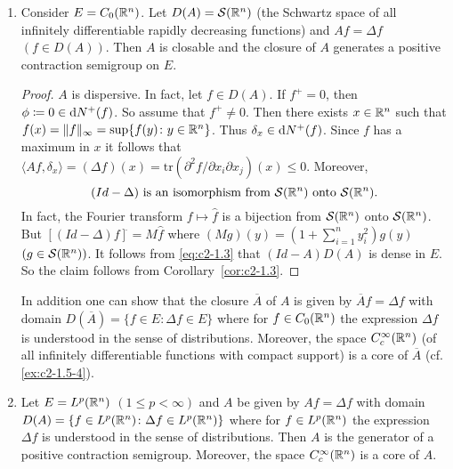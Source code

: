 \begin{examples}
\begin{enumerate}[\upshape (i), wide, labelsep=.5em]
\begin{proof}
We have shown that $A$ is dispersive. 
As in \ref{ex:c2-1.5-1}   one shows that $(Id - A)$ is surjective. 
Now the claim follows from Theorem \ref{thm:c2-1.2}  .
\end{proof}
\item \label{ex:c2-1.5-3} 
Consider $E = C_{0}(\mathbb{R}^{n})$. 
Let $D(A) = \mathcal{S}(\mathbb{R}^{n})$ (the Schwartz space of all infinitely differentiable rapidly decreasing functions) and $Af = \Delta f$ $(f \in D(A))$. 
Then $A$ is closable and the closure of $A$ generates a positive contraction semigroup on $E$.
\begin{proof}
$A$ is dispersive. 
In fact, let $f \in D(A)$. 
If $f^{+} = 0$, then $\phi \coloneqq 0 \in \mathop{}\!\mathrm{d}{N^{+}}(f)$. 
So assume that $f^{+} \neq 0$. 
Then there exists $x \in \mathbb{R}^{n}$ such that $f(x) = \|f\|_{\infty} = \sup\{f(y) \colon y \in \mathbb{R}^{n}\}$. 
Thus $\delta_{x} \in \mathop{}\!\mathrm{d}{N^{+}}(f)$.
Since $f$ has a maximum in $x$ it follows that $\langle Af,\delta_{x} \rangle = (\Delta f)(x) = \text{tr}(\partial^{2}f/\partial x_{i}\partial x_{j})(x) \leq 0$. 
Moreover,
\begin{equation}\label{eq:c2-1.3}
(Id - \Delta) \text{ is an isomorphism from } \mathcal{S}(\mathbb{R}^{n}) \text{ onto } \mathcal{S}(\mathbb{R}^{n}).
\end{equation}
In fact, the Fourier transform $f \mapsto \hat{f}$ is a bijection from $\mathcal{S}(\mathbb{R}^{n})$ onto $\mathcal{S}(\mathbb{R}^{n})$.
But $[(Id - \Delta)f]^{\hat{}} = M\hat{f}$ where $(Mg)(y) = (1 + \sum_{i=1}^{n} y_{i}^{2})g(y)$ $(g \in \mathcal{S}(\mathbb{R}^{n}))$. It follows from \eqref{eq:c2-1.3}    that $(Id - A)D(A)$ is dense in $E$. So the claim follows from Corollary~\ref{cor:c2-1.3}.
\end{proof}
\begin{remark*}\label{rem:c2-1.2}
In addition one can show that the closure $\overline{A}$ of $A$ is given by $\overline{A}f = \Delta f$ with domain $D(\overline{A}) = \{f \in E \colon \Delta f \in E\}$ where for
$f \in C_{0}(\mathbb{R}^{n})$ the expression $\Delta f$ is understood in the sense of distributions. 
Moreover, the space $C_{c}^{\infty}(\mathbb{R}^{n})$ (of all infinitely differentiable functions with compact support) is a core of $\overline{A}$ (cf. \ref{ex:c2-1.5-4}).
\end{remark*}
\item \label{ex:c2-1.5-4} 
Let $E = L^{p}(\mathbb{R}^{n})$ $(1 \leq p < \infty)$ and $A$ be given by $Af = \Delta f$ with domain $D(A) = \{f \in L^{p}(\mathbb{R}^{n}) \colon \Delta f \in L^{p}(\mathbb{R}^{n})\}$ where for $f \in L^{p}(\mathbb{R}^{n})$ the expression $\Delta f$ is understood in the sense of distributions. Then $A$ is the generator of a positive contraction semigroup. Moreover, the space $C_{c}^{\infty}(\mathbb{R}^{n})$ is a core of $A$.

\end{enumerate}
\end{examples}
